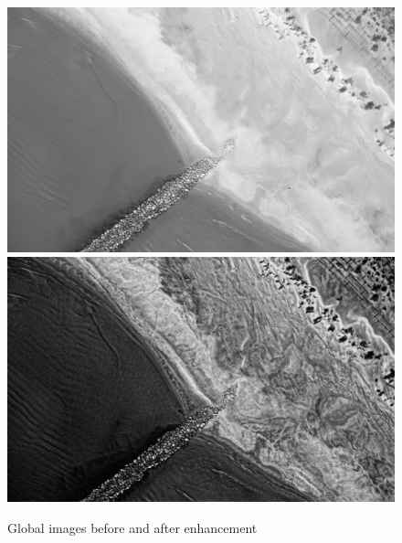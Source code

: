 \begin{figure}
\begin{center}
\includegraphics[width=160mm]{FIGS/Tapioca-SFS/Im-STD.jpg}
\includegraphics[width=160mm]{FIGS/Tapioca-SFS/Im-SFS.jpg}
\end{center}
\caption{Global images before and after enhancement}
\label{FIG:SF:Img}
\end{figure}



